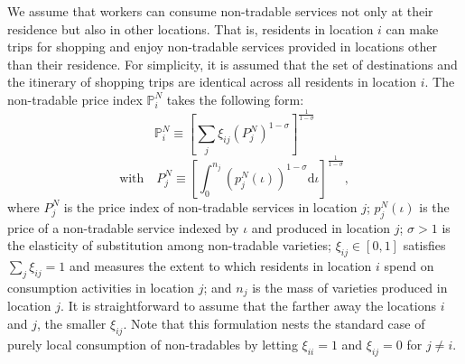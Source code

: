 \documentclass[12pt, unicode, a4paper]{article}
\newcommand{\1}{\mbox{1}\hspace{-0.25em}\mbox{l}} %
\begin{document}
We assume that workers can consume non-tradable services not only at their residence but also in other locations. That is, residents in location $i$ can make trips for shopping and enjoy non-tradable services provided in locations other than their residence. For simplicity, it is assumed that the set of destinations and the itinerary of shopping trips are identical across all residents in location $i$.
The non-tradable price index $\mathbb{P}_{i}^N$ takes the following form:
\begin{equation}
\label{eq:price_index_N}
    \mathbb{P}_{i}^N \equiv \left[
    \sum_j \xi_{ij} (P_j^N)^{1-\sigma}
    \right]^{\frac{1}{1-\sigma}}
\end{equation}
\begin{equation}
\label{eq:price_index_N_2}
    \mbox{with} \quad
    P_j^N \equiv \left[
    \int_0^{n_j} (p_j^N(\iota))^{1-\sigma} \mathrm{d}\iota
    \right]^{\frac{1}{1-\sigma}}
    ,
\end{equation}
where $P_j^N$ is the price index of non-tradable services in location $j$; $p_j^N(\iota)$ is the price of a non-tradable service indexed by $\iota$ and produced in location $j$; $\sigma>1$ is the elasticity of substitution among non-tradable varieties; $\xi_{ij} \in [0,1]$ satisfies $\sum_j \xi_{ij}=1$ and measures the extent to which residents in location $i$ spend on consumption activities in location $j$; and $n_j$ is the mass of varieties produced in location $j$. It is straightforward to assume that the farther away the locations $i$ and $j$, the smaller $\xi_{ij}$. Note that this formulation nests the standard case of purely local consumption of non-tradables by letting $\xi_{ii}=1$ and $\xi_{ij}=0$ for $j \neq i$.
\end{document}
